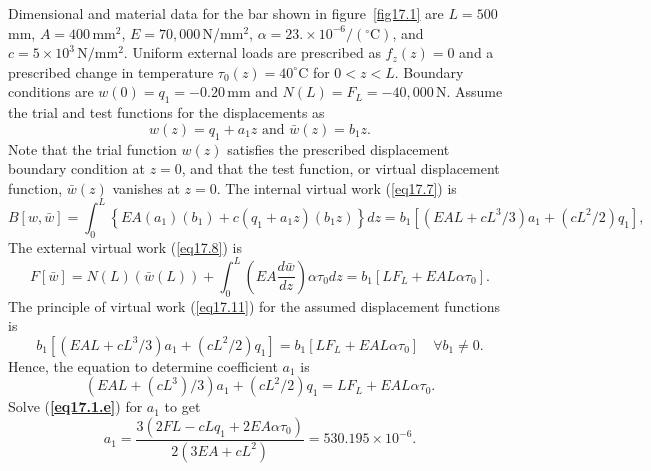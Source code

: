 \documentclass{AeroStructure-ERJohnson}
\begin{document}
\begin{example}\label{ex17.1}Dimensional and material data for the bar shown in figure~\ref{fig17.1} are $L= 500$\,mm, $A= 400$\,mm$^{2}$, $E= 70{,}000$\,N/mm$^{2}$, $\alpha=23 . \times 10^{-6} /\left({ }^{\circ} \mathrm{C}\right)$, and $c=5 \times 10^{3}\,\mathrm{N}/\mathrm{mm}^{2}$. Uniform external loads are prescribed as $f_{z}(z)=0$ and a prescribed change in temperature $\tau_{0}(z)=40^{\circ} \mathrm{C}$ for $0<z<L$. Boundary conditions are $w(0)=q_{1}=-0.20\,\mathrm{mm}$ and $N(L)=F_{L}=-40{,}000\,\mathrm{N}$. Assume the trial and test functions for the displacements as
\begin{equation}
w(z)=q_{1}+a_{1} z \textrm{ and } \bar{w}(z)=b_{1} z. \label{eq17.1.a}\tag{a}
\end{equation}
Note that the trial function $w(z)$ satisfies the prescribed displacement boundary condition at $z=0$, and that the test function, or virtual displacement function, $\bar{w}(z)$ vanishes at $z=0$. The internal virtual work (\ref{eq17.7}) is
\begin{equation}
B[w, \bar{w}]=\int_{0}^{L}\left\{E A\left(a_{1}\right)\left(b_{1}\right)+c\left(q_{1}+a_{1} z\right)\left(b_{1} z\right)\right\} d z=b_{1}\left[\left(E A L+c L^{3}/3\right) a_{1}+\left(c L^{2}/2\right) q_{1}\right], \label{eq17.1.b}\tag{b}
\end{equation}
The external virtual work (\ref{eq17.8}) is
\begin{equation}
F[\bar{w}]=N(L)(\bar{w}(L))+\int_{0}^{L}\left(E A \frac{d \bar{w}}{d z}\right) \alpha \tau_{0} d z=b_{1}\left[L F_{L}+E A L \alpha \tau_{0}\right]. \label{eq17.1.c}\tag{c}
\end{equation}
The principle of virtual work (\ref{eq17.11}) for the assumed displacement functions is
\begin{equation}
b_{1}\left[\left(E A L+c L^{3}/3\right) a_{1}+\left(c L^{2}/2\right) q_{1}\right]=b_{1}\left[L F_{L}+E A L \alpha \tau_{0}\right] \quad \forall b_{1} \neq 0. \label{eq17.1.d}\tag{d}
\end{equation}
Hence, the equation to determine coefficient $a_1$ is
\begin{equation}
\left(E A L+\left(c L^{3}\right)/3\right) a_{1}+\left(c L^{2}/2\right) q_{1}=L F_{L}+E A L \alpha \tau_{0}. \label{eq17.1.e}\tag{e}
\end{equation}
Solve (\textbf{\ref{eq17.1.e}}) for $a_1$ to get
\begin{equation}
a_{1}=\frac{3\left(2 F L-c L q_{1}+2 E A \alpha \tau_{0}\right)}{2\left(3 E A+c L^{2}\right)}=530.195 \times 10^{-6}. \label{eq17.1.f}\tag{f}

\end{equation}
\end{example}
\end{document}

